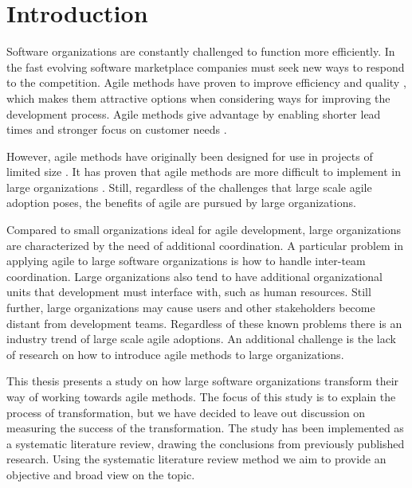 
\chapter{Introduction}

Software organizations are constantly challenged to function more efficiently.
In the fast evolving software marketplace companies must seek new ways to
respond to the competition. Agile methods have proven to improve efficiency and
quality \citep{Livermore2008}, which makes them attractive options when
considering ways for improving the development process. Agile methods give
advantage by enabling shorter lead times and stronger focus on customer needs
\citep{Petersen2010}.

However, agile methods have originally been designed for use in projects of
limited size \citep{Boehm2005}. It has proven that agile methods are more
difficult to implement in large organizations \citep{Dyba2009}.
Still, regardless of the challenges that large scale agile adoption poses, the
benefits of agile are pursued by large organizations.

Compared to small organizations ideal for agile development, large organizations
are characterized by the need of additional coordination. A particular problem
in applying agile to large software organizations is how to handle inter-team
coordination. Large organizations also tend to have additional organizational
units that development must interface with, such as human resources.
Still further, large organizations may cause users and other stakeholders become
distant from development teams.
Regardless of these known problems there is an industry trend of large scale
agile adoptions. An additional challenge is the lack of research on how to
introduce agile methods to large organizations.

This thesis presents a study on how large software organizations transform their
way of working towards agile methods. The focus of this study is to explain the
process of transformation, but we have decided to leave out discussion on
measuring the success of the transformation. The study has been implemented as a
systematic literature review, drawing the conclusions from previously published
research. Using the systematic literature review method we aim to provide an
objective and broad view on the topic.

